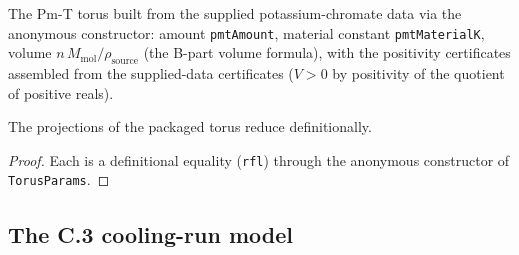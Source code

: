 \begin{definition}
\label{def:IPhO2026Problems_problem_IPhO_2026_3_C_3:potassiumChromateTorus}
The Pm-T torus built from the supplied potassium-chromate data via the
anonymous constructor: amount \texttt{pmtAmount}, material constant
\texttt{pmtMaterialK}, volume $n\,M_{\mathrm{mol}} / \rho_{\mathrm{source}}$
(the B-part volume formula), with the positivity certificates assembled from
the supplied-data certificates ($V > 0$ by positivity of the quotient of
positive reals).
\end{definition}

\begin{lemma}
\label{lem:IPhO2026Problems_problem_IPhO_2026_3_C_3:potassiumChromateTorus_n}
The projections of the packaged torus reduce definitionally.

\end{lemma}
\begin{proof}
Each is a definitional equality (\texttt{rfl}) through the anonymous
constructor of \texttt{TorusParams}.
\end{proof}

\subsection*{The C.3 cooling-run model}

